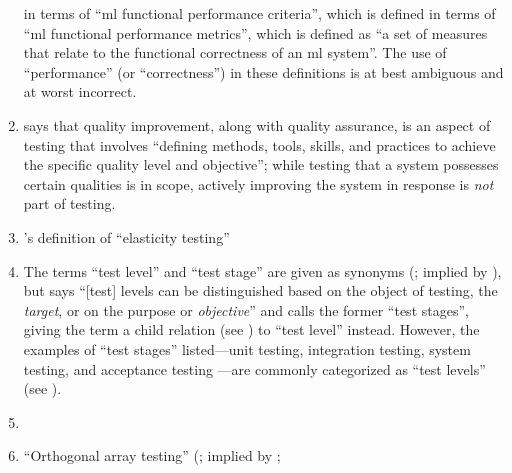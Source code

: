 \begin{enumerate}
          in terms of ``\acs{ml} functional performance criteria'',
          which is defined in terms of ``\acs{ml} functional performance
          metrics'', which is defined as ``a set of measures that relate to the
          functional correctness of an \acs{ml} system''. The use
          of ``performance'' (or ``correctness'') in these definitions is at
          best ambiguous and at worst incorrect.
    \item %
          \citet[p.~5\=/4]{SWEBOK2024} says that quality improvement,
          along with quality assurance, is an aspect of testing that involves
          ``defining methods, tools, skills, and practices to achieve the
          specific quality level and objective''; while testing that a system
          possesses certain qualities is in scope, actively improving the
          system in response is \emph{not} part of testing.
    \item %
          \citet[p.~5\=/9]{SWEBOK2024}'s definition of
          ``elasticity testing'' \swebokElasRef{}
    \item %
          The terms ``test level'' and ``test stage'' are given as synonyms
          (\citealpISTQB{}; implied by \citealp[p.~9]{Gerrard2000a}), but
          \citet[p.~5\=/6]{SWEBOK2024} says ``[test] levels can be distinguished
          based on the object of testing, the \emph{target}, or on the purpose
          or \emph{objective}'' and calls the former ``test stages'', giving
          the term a child relation (see ) to ``test level''
          instead. However, the examples of ``test stages'' listed---unit
          testing, integration testing, system testing, and acceptance testing
          \citep[pp.~5\=/6 to 5\=/7]{SWEBOK2024}---are commonly categorized as
          ``test levels'' (see ).
    \item %
          \tolTestFlaw{}
    \item %
          ``Orthogonal array testing'' (\citealp[pp.~5\=/1, 5\=/11]{SWEBOK2024};
          implied by \citealp[pp.~467, 473]{Valcheva2013};

\end{enumerate}
